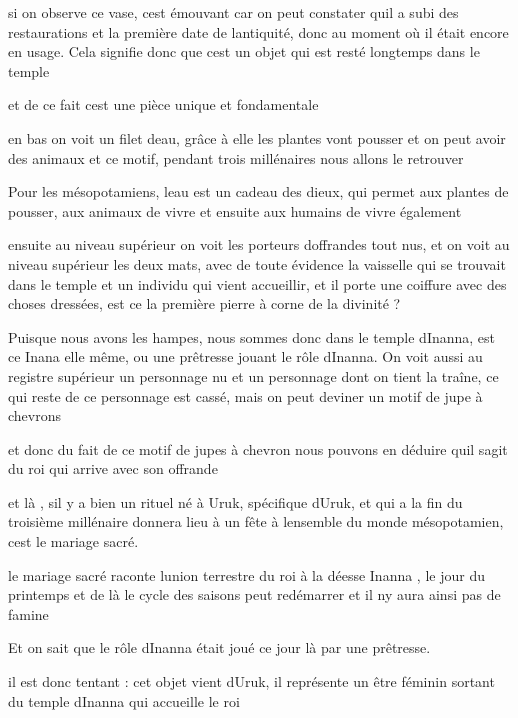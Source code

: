 \documentclass{article}
\begin{document}
si on observe ce vase, c{\textquotesingle}est émouvant car on peut
constater qu{\textquotesingle}il a subi des restaurations  et la
première date de l{\textquotesingle}antiquité, donc au moment où il
était encore en usage. Cela signifie donc que c{\textquotesingle}est un
objet qui est resté longtemps dans le temple

et de ce fait c{\textquotesingle}est une pièce unique et fondamentale

en bas on voit un filet d{\textquotesingle}eau, grâce à elle les 
plantes vont pousser  et on peut avoir des animaux et ce motif, pendant
trois millénaires nous allons le retrouver

Pour les mésopotamiens, l{\textquotesingle}eau est un cadeau des dieux,
qui permet aux plantes de pousser, aux animaux de vivre et ensuite aux
humains de vivre également

ensuite au niveau supérieur on voit les porteurs
d{\textquotesingle}offrandes tout nus, et on voit au niveau supérieur
les deux mats, avec de toute évidence la vaisselle qui se trouvait dans
le temple et un individu qui vient accueillir, et il porte une coiffure
avec des choses dressées, est  ce la première pierre à corne de la
divinité ?

Puisque nous avons les hampes, nous sommes donc dans le temple
d{\textquotesingle}Inanna, est ce Inana elle même, ou une prêtresse
jouant le rôle d{\textquotesingle}Inanna. On voit aussi au registre
supérieur un personnage nu et un personnage dont on tient la traîne, ce
qui reste de ce personnage est cassé, mais on peut deviner un motif de
jupe à chevrons

et donc du fait de ce motif de jupes à chevron nous pouvons en déduire
qu{\textquotesingle}il s{\textquotesingle}agit du roi qui arrive avec
son offrande

et là , s{\textquotesingle}il y a bien un rituel né à Uruk, spécifique
d{\textquotesingle}Uruk, et qui a la fin du troisième millénaire
donnera lieu à un fête à l{\textquotesingle}ensemble du monde
mésopotamien, c{\textquotesingle}est le mariage sacré.

le mariage sacré  raconte l{\textquotesingle}union terrestre du roi à la
déesse Inanna , le jour du printemps et de là le cycle des saisons peut
redémarrer et il n{\textquotesingle}y aura ainsi pas de famine

Et on sait que le rôle d{\textquotesingle}Inanna était joué ce jour là
par une prêtresse.

il est donc tentant : cet objet vient d{\textquotesingle}Uruk, il
représente un être féminin sortant du temple d{\textquotesingle}Inanna
qui accueille le roi
\end{document}
